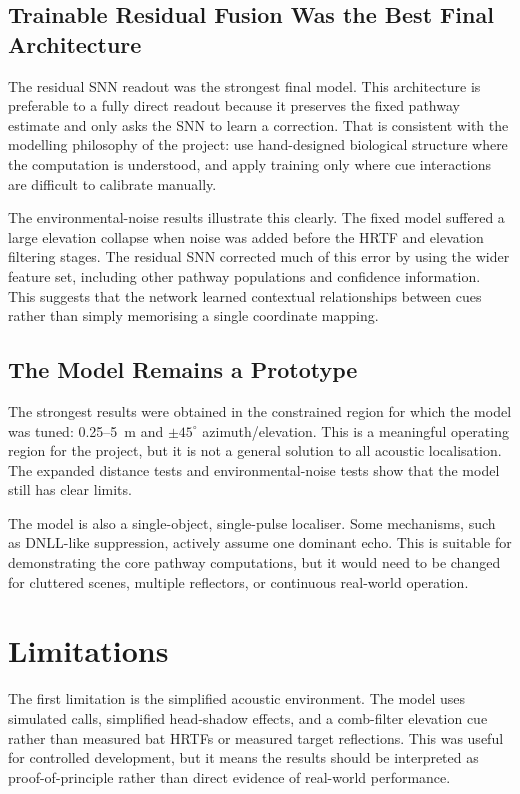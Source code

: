 \subsection{Trainable Residual Fusion Was the Best Final Architecture}

The residual SNN readout was the strongest final model. This architecture is preferable to a fully direct readout because it preserves the fixed pathway estimate and only asks the SNN to learn a correction. That is consistent with the modelling philosophy of the project: use hand-designed biological structure where the computation is understood, and apply training only where cue interactions are difficult to calibrate manually.

The environmental-noise results illustrate this clearly. The fixed model suffered a large elevation collapse when noise was added before the HRTF and elevation filtering stages. The residual SNN corrected much of this error by using the wider feature set, including other pathway populations and confidence information. This suggests that the network learned contextual relationships between cues rather than simply memorising a single coordinate mapping.

\subsection{The Model Remains a Prototype}

The strongest results were obtained in the constrained region for which the model was tuned: 0.25--5~m and $\pm45^\circ$ azimuth/elevation. This is a meaningful operating region for the project, but it is not a general solution to all acoustic localisation. The expanded distance tests and environmental-noise tests show that the model still has clear limits.

The model is also a single-object, single-pulse localiser. Some mechanisms, such as DNLL-like suppression, actively assume one dominant echo. This is suitable for demonstrating the core pathway computations, but it would need to be changed for cluttered scenes, multiple reflectors, or continuous real-world operation.

\section{Limitations}

The first limitation is the simplified acoustic environment. The model uses simulated calls, simplified head-shadow effects, and a comb-filter elevation cue rather than measured bat HRTFs or measured target reflections. This was useful for controlled development, but it means the results should be interpreted as proof-of-principle rather than direct evidence of real-world performance.

